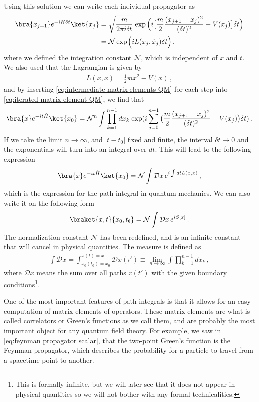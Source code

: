 Using this solution we can write each individual propagator as
\begin{align}\label{eq:intermediate matrix elements QM}
    \bra{x_{j+1}}e^{-iH\delta t}\ket{x_j}&=\sqrt{\frac{m}{2\pi i\delta t}}\,\exp\Big(i\big[\frac{m}{2}\frac{(x_{j+1}-x_j)^{2}}{(\delta t)^{2}}-V(x_j)\big]\delta t\Big)\nonumber
    \\
    &=\mathcal{N}\exp\Big(iL(x_j,\dot{x}_{j})\delta t\Big)\,,
\end{align}
where we defined the integration constant $\mathcal{N}$, which is independent of $x$ and $t$. We also used that the Lagrangian is given by
\begin{align}
    L(x,\dot{x})=\frac{1}{2}m\dot{x}^{2}-V(x)\,,
\end{align}
and by inserting \cref{eq:intermediate matrix elements QM} for each step into \cref{eq:iterated matrix element QM}, we find that
\begin{align}
    \bra{x}e^{-it\hat{H}}\ket{x_{0}}=\mathcal{N}^{n}\int\prod_{k=1}^{n-1}dx_k\,\exp(i\sum_{j=0}^{n-1}\big(\frac{m}{2}\frac{(x_{j+1}-x_j)^{2}}{(\delta t)^{2}}-V(x_j)\big)\delta t)\,.
\end{align}
If we take the limit $n\rightarrow \infty$, and $|t-t_0|$ fixed and finite, the interval $\delta t \rightarrow 0$ and the exponentials will turn into an integral over $dt$. This will lead to the following expression
\begin{align}
    \bra{x}e^{-it\hat{H}}\ket{x_{0}}=\mathcal{N}\int \mathcal{D}x\,e^{i\int dt L(x,\dot{x})}\,,
\end{align}
which is the expression for the path integral in quantum mechanics. We can also write it on the following form
\begin{align}
    \braket{x,t}{x_0,t_0}=\mathcal{N}\int \mathcal{D}x\,e^{iS[x]}\,.
\end{align}
The normalization constant $\mathcal{N}$ has been redefined, and is an infinite constant that will cancel in physical quantities. The measure is defined as
\begin{align}
    \int \mathcal{D}x=\int_{x_0(t_0)=x_0}^{x(t)=x} \mathcal{D}x(t')\equiv \lim_{n\to\infty}\int\prod_{k=1}^{n-1}dx_{k}\,,
\end{align}
where $\mathcal{D}x$ means the sum over all paths $x(t')$ with the given boundary conditions\footnote{This is formally infinite, but we will later see that it does not appear in physical quantities so we will not bother with any formal technicalities.}.

One of the most important features of path integrals is that it allows for an easy computation of matrix elements of operators. These matrix elements are what is called correlators or Green's functions as we call them, and are probably the most important object for any quantum field theory. For example, we saw in \cref{eq:feynman propagator scalar}, that the two-point Green's function is the Feynman propagator, which describes the probability for a particle to travel from a spacetime point to another. 


